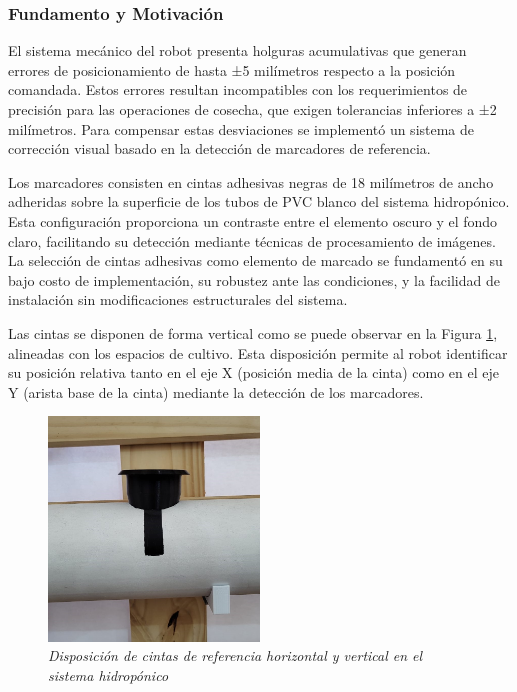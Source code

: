 \subsubsection{Fundamento y Motivación}

El sistema mecánico del robot presenta holguras acumulativas que generan errores de posicionamiento de hasta ±5 milímetros respecto a la posición comandada. Estos errores resultan incompatibles con los requerimientos de precisión para las operaciones de cosecha, que exigen tolerancias inferiores a ±2 milímetros. Para compensar estas desviaciones se implementó un sistema de corrección visual basado en la detección de marcadores de referencia.

Los marcadores consisten en cintas adhesivas negras de 18 milímetros de ancho adheridas sobre la superficie de los tubos de PVC blanco del sistema hidropónico. Esta configuración proporciona un contraste entre el elemento oscuro y el fondo claro, facilitando su detección mediante técnicas de procesamiento de imágenes. La selección de cintas adhesivas como elemento de marcado se fundamentó en su bajo costo de implementación, su robustez ante las condiciones, y la facilidad de instalación sin modificaciones estructurales del sistema.

Las cintas se disponen de forma vertical como se puede observar en la Figura \ref{fig:configuracion_cintas}, alineadas con los espacios de cultivo. Esta disposición permite al robot identificar su posición relativa tanto en el eje X (posición media de la cinta) como en el eje Y (arista base de la cinta) mediante la detección de los marcadores.

\begin{figure}[h]
\centering
\includegraphics[width=0.50\textwidth]{imagenes/configuracion_cintas_referencia.jpg}
\caption{\textit{Disposición de cintas de referencia horizontal y vertical en el sistema hidropónico}}
\label{fig:configuracion_cintas}
\end{figure}
